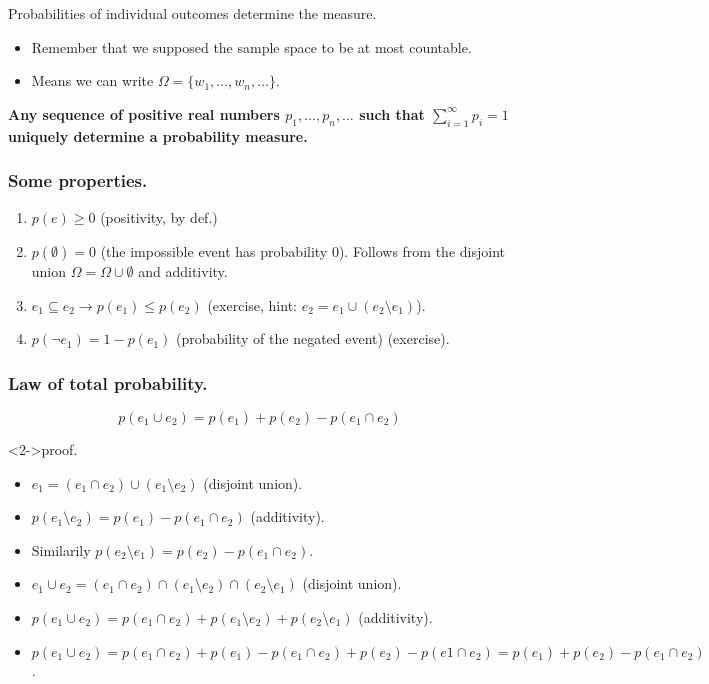 \documentclass{beamer}
\begin{document}
\begin{frame}{Probabilities of individual outcomes determine the measure.}
  \begin{itemize}
  \item Remember that we supposed the sample space to be at most countable.
  \item Means we can write $\Omega = \{ w_1, \dots, w_n, \dots\}$.
  \end{itemize}

  {\bf Any sequence of positive real numbers $p_1, \dots, p_n, \dots$ such that $\sum^{\infty}_{i=1} p_i = 1$ uniquely determine a probability measure.}
\end{frame}

\begin{frame}
  \frametitle{Some properties.}
  \begin{enumerate}
  \item $p(e) \ge 0$ (positivity, by def.)
  \item $p(\emptyset) = 0$ (the impossible event has probability $0$). Follows from the disjoint union $\Omega = \Omega \cup \emptyset$ and additivity.
  \item $e_1 \subseteq e_2 \rightarrow p(e_1) \le p(e_2)$ (exercise, hint: $e_2 = e_1 \cup (e_2 \setminus e_1)$).
  \item $p(\neg e_1) = 1 - p(e_1)$ (probability of the negated event) (exercise).
  \end{enumerate}
\end{frame}

\begin{frame}
  \frametitle{Law of total probability.}
  \[ p(e_1 \cup e_2) = p(e_1) + p(e_2) - p(e_1 \cap e_2)\]

  \begin{block}<2->{proof.}
    \begin{itemize}
    \item<3-> $e_1 = (e_1 \cap e_2) \cup (e_1 \setminus e_2)$ (disjoint union).
    \item<4-> $p(e_1 \setminus e_2) = p(e_1) - p(e_1 \cap e_2)$ (additivity).
    \item<5-> Similarily $p(e_2 \setminus e_1) = p(e_2) - p(e_1 \cap e_2)$.
    \item<6-> $e_1 \cup e_2 = (e_1 \cap e_2) \cap (e_1 \setminus e_2) \cap (e_2 \setminus e_1)$ (disjoint union).
    \item<7-> $p(e_1 \cup e_2) = p(e_1 \cap e_2) + p(e_1 \setminus e_2) + p(e_2 \setminus e_1)$ (additivity).
    \item<8-> $p(e_1 \cup e_2) = p(e_1 \cap e_2) + p(e_1) - p(e_1 \cap e_2) + p(e_2) - p(e1 \cap e_2) = p(e_1) + p(e_2) - p(e_1 \cap e_2)$.
    \end{itemize}
  \end{block}
\end{frame}
  
\end{document}
